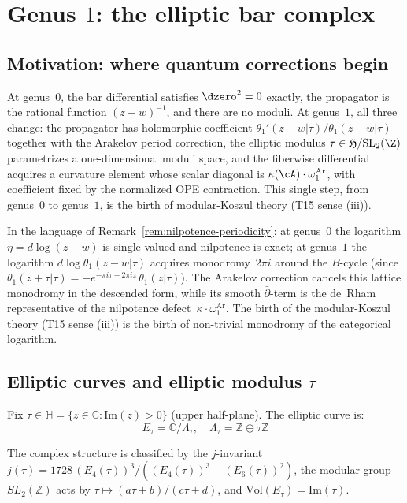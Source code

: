 \section{\texorpdfstring{Genus $1$: the elliptic bar complex}{Genus 1: the elliptic bar complex}}
\label{sec:genus-1-elliptic-complete}

\subsection{Motivation: where quantum corrections begin}

At genus~$0$, the bar differential satisfies $\dzero^2 = 0$ exactly,
the propagator is the rational function $(z - w)^{-1}$, and there
are no moduli. At genus~$1$, all three change: the propagator
has holomorphic coefficient
$\theta_1'(z-w|\tau)/\theta_1(z-w|\tau)$ together with the Arakelov
period correction,
the elliptic modulus $\tau \in \mathfrak H / \mathrm{SL}_2(\Z)$ parametrizes a one-dimensional moduli
	space, and the fiberwise differential acquires a curvature element
	whose scalar diagonal is $\kappa(\cA)\cdot\omega_1^{\mathrm{Ar}}$,
	with coefficient fixed by the normalized OPE contraction. This
	single step, from genus~$0$ to genus~$1$, is
the birth of modular-Koszul theory (T15 sense (iii)).

In the language of Remark~\ref{rem:nilpotence-periodicity}: at
genus~$0$ the logarithm $\eta = d\log(z-w)$ is single-valued and
nilpotence is exact; at genus~$1$ the logarithm
$d\log\theta_1(z-w|\tau)$ acquires monodromy~$2\pi i$ around the
$B$-cycle (since
$\theta_1(z + \tau|\tau) = -e^{-\pi i\tau - 2\pi i z}\,
\theta_1(z|\tau)$). The Arakelov correction cancels this lattice
monodromy in the descended form, while its smooth
$\bar\partial$-term is the de~Rham representative of the nilpotence
defect~$\kappa\cdot\omega_1^{\mathrm{Ar}}$. The birth of the
modular-Koszul theory (T15 sense (iii)) is the birth of non-trivial monodromy of the
categorical logarithm.

\subsection{Elliptic curves and elliptic modulus \texorpdfstring{$\tau$}{tau}}

\begin{definition}
\label{def:elliptic-curve-tau}
Fix $\tau \in \mathbb{H} = \{z \in \mathbb{C} : \text{Im}(z) > 0\}$ (upper half-plane).
The elliptic curve is:
\begin{equation}
E_\tau = \mathbb{C} / \Lambda_\tau, \quad \Lambda_\tau = \mathbb{Z} \oplus \tau\mathbb{Z}
\end{equation}

The complex structure is classified by the $j$-invariant $j(\tau) = 1728\,(E_4(\tau))^3/((E_4(\tau))^3 - (E_6(\tau))^2)$, the modular group $SL_2(\mathbb{Z})$ acts by $\tau \mapsto (a\tau + b)/(c\tau + d)$, and $\text{Vol}(E_\tau) = \text{Im}(\tau)$.
\end{definition}

